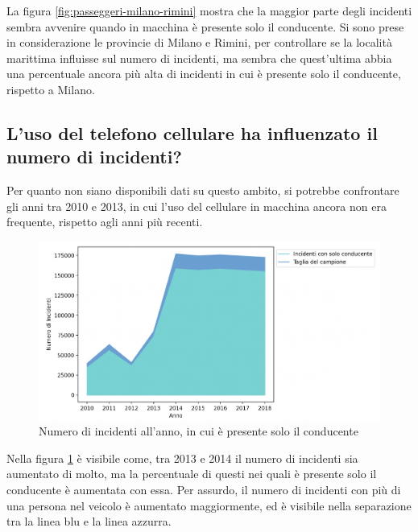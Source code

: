 \documentclass[a4paper]{report}
\begin{document}
La figura \ref{fig:passeggeri-milano-rimini} mostra che la maggior parte degli incidenti 
sembra avvenire quando in macchina è presente solo il conducente.
Si sono prese in considerazione le provincie di Milano e Rimini, per controllare se la località 
marittima influisse sul numero di incidenti, ma sembra che quest'ultima abbia una percentuale 
ancora più alta di incidenti in cui è presente solo il conducente, rispetto a Milano.


\subsection{L'uso del telefono cellulare ha influenzato il numero di incidenti?}

Per quanto non siano disponibili dati su questo ambito, si potrebbe confrontare gli anni tra 2010 e 2013, 
in cui l'uso del cellulare in macchina ancora non era frequente, rispetto agli anni più recenti.

\begin{figure}
    \includegraphics[width=\linewidth]{../src/incidenti/incidenti_senza_coords/anno/incremento_incidenti.png}
    \caption{Numero di incidenti all'anno, in cui è presente solo il conducente}
    \label{fig:incremento-incidenti}
\end{figure}

Nella figura \ref{fig:incremento-incidenti} è visibile come, 
tra 2013 e 2014 il numero di incidenti sia aumentato di molto, 
ma la percentuale di questi nei quali è presente solo il conducente è aumentata con essa.
Per assurdo, il numero di incidenti con più di una persona nel veicolo è aumentato maggiormente, 
ed è visibile nella separazione tra la linea blu e la linea azzurra.\\
\end{document}
